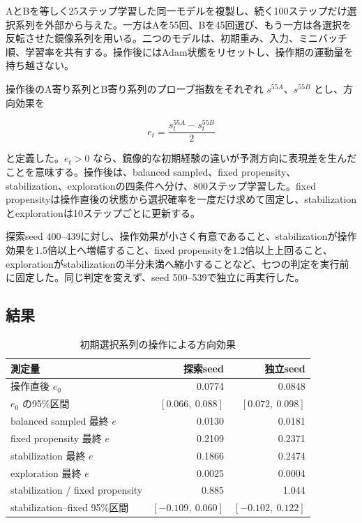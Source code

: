 \documentclass[11pt,a4paper]{ltjsarticle}
\begin{document}
AとBを等しく25ステップ学習した同一モデルを複製し、続く100ステップだけ選択系列を外部から与えた。一方はAを55回、Bを45回選び、もう一方は各選択を反転させた鏡像系列を用いる。二つのモデルは、初期重み、入力、ミニバッチ順、学習率を共有する。操作後にはAdam状態をリセットし、操作期の運動量を持ち越さない。

操作後のA寄り系列とB寄り系列のプローブ指数をそれぞれ $s^{55A}$、$s^{55B}$ とし、方向効果を

\begin{equation}
e_t=\frac{s_t^{55A}-s_t^{55B}}{2}
\end{equation}

と定義した。$e_t>0$ なら、鏡像的な初期経験の違いが予測方向に表現差を生んだことを意味する。操作後は、balanced sampled、fixed propensity、stabilization、explorationの四条件へ分け、800ステップ学習した。fixed propensityは操作直後の状態から選択確率を一度だけ求めて固定し、stabilizationとexplorationは10ステップごとに更新する。

探索seed 400--439に対し、操作効果が小さく有意であること、stabilizationが操作効果を1.5倍以上へ増幅すること、fixed propensityを1.2倍以上上回ること、explorationがstabilizationの半分未満へ縮小することなど、七つの判定を実行前に固定した。同じ判定を変えず、seed 500--539で独立に再実行した。

\subsection{結果}

\begin{table}[ht]
\centering
\caption{初期選択系列の操作による方向効果}
\label{tab:causal}
\begin{tabular}{lrr}
\toprule
測定量 & 探索seed & 独立seed \\
\midrule
操作直後 $e_0$ & 0.0774 & 0.0848 \\
$e_0$ の95\%区間 & $[0.066,\ 0.088]$ & $[0.072,\ 0.098]$ \\
balanced sampled 最終 $e$ & 0.0130 & 0.0181 \\
fixed propensity 最終 $e$ & 0.2109 & 0.2371 \\
stabilization 最終 $e$ & 0.1866 & 0.2474 \\
exploration 最終 $e$ & 0.0025 & 0.0004 \\
stabilization / fixed propensity & 0.885 & 1.044 \\
stabilization--fixed 95\%区間 & $[-0.109,\ 0.060]$ & $[-0.102,\ 0.122]$ \\
\bottomrule
\end{tabular}
\end{table}
\end{document}
